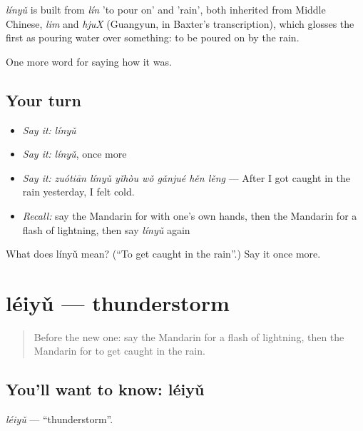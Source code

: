 \begin{cousinweb}
\emph{línyǔ} is built from \emph{lín} 'to pour on' and  'rain', both inherited from Middle Chinese, \emph{lim} and \emph{hjuX} (Guangyun, in Baxter's transcription), which glosses the first as pouring water over something: to be poured on by the rain.
\end{cousinweb}

\begin{grammarlens}[title={What you've built}]
One more word for saying how it was.
\end{grammarlens}

\subsection*{Your turn}
\begin{itemize}
\raggedright
  \item \emph{Say it:} \emph{línyǔ}
  \item \emph{Say it:} \emph{línyǔ}, once more
  \item \emph{Say it:} \emph{zuótiān línyǔ yǐhòu wǒ gǎnjué hěn lěng} — After I got caught in the rain yesterday, I felt cold.
  \item \emph{Recall:} say the Mandarin for with one's own hands, then the Mandarin for a flash of lightning, then say \emph{línyǔ} again
\end{itemize}

\begin{tcolorbox}[breakable,colback=teal!4,colframe=teal!35!black,title={Before you move on}]
What does línyǔ mean? (\textquotedblleft{}To get caught in the rain\textquotedblright{}.) Say it once more.
\end{tcolorbox}
\section[léiyǔ]{léiyǔ — thunderstorm}

\label{lesson:ZH-C514-leiyu}



\begin{quote}
Before the new one: say the Mandarin for a flash of lightning, then the Mandarin for to get caught in the rain.
\end{quote}

\subsection*{You'll want to know: léiyǔ}
\emph{léiyǔ} — \textquotedblleft{}thunderstorm\textquotedblright{}.

